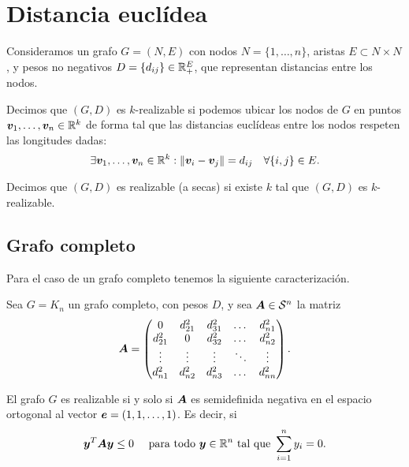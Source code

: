 \section{Distancia euclídea}

Consideramos un grafo $G = (N, E)$ con nodos $N = \{1, \dots, n\}$, aristas $E \subset N \times N$, y pesos no negativos $D = \{d_{ij}\} \in \mathbb{R}_+^E$, que representan distancias entre los nodos.

Decimos que $(G, D)$ es $k$-realizable si podemos ubicar los nodos de $G$ en puntos $\bm{v}_1, \dots, \bm{v}_n \in \mathbb{R}^k$ de forma tal que las distancias euclídeas entre los nodos respeten las longitudes dadas:
$$
\exists \bm{v}_1, \dots, \bm{v}_n \in \mathbb{R}^k:  \| \bm{v}_i - \bm{v}_j \| = d_{ij} \quad \forall \{i, j\} \in E.
$$

Decimos que $(G, D)$ es realizable (a secas) si existe $k$ tal que $(G, D)$ es $k$-realizable.

\subsection{Grafo completo}

Para el caso de un grafo completo tenemos la siguiente caracterización.

\begin{theorem}
Sea $G = K_n$ un grafo completo, con pesos $D$, y sea $\bm{A} \in {\mathcal S}^{n}$ la matriz
{\small
$$
\bm{A} = \begin{pmatrix}
0 & d_{21}^2 & d_{31}^2 & \dots & d_{n1}^2 \\
d_{21}^2 & 0 & d_{32}^2 & \dots & d_{n2}^2 \\
\vdots & \vdots & \vdots & \ddots & \vdots \\
d_{n1}^2 & d_{n2}^2 & d_{n3}^2 & \dots & d_{nn}^2
\end{pmatrix}.
$$}
\vspace{-0.5cm}

El grafo $G$ es realizable si y solo si $\bm{A}$ es semidefinida negativa en el espacio ortogonal al vector $\bm{e} = (1, 1, \dots, 1)$. Es decir, si
$$
\bm{y}^T \bm{A} \bm{y} \le 0 \quad \text{ para todo } \bm{y} \in \mathbb{R}^n \text{ tal que } \sum_{i=1}^n y_i = 0.
$$
\end{theorem}


